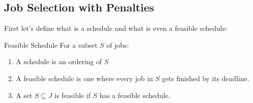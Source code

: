 \subsection{Job Selection with Penalties}

\begin{algoprob}
\end{algoprob}

First let's define what is a schedule and what is even a feasible schedule:

\begin{Definition}{Feasible Schedule}{}
	For a subset $S$ of jobs:
	\begin{enumerate}[label=\bfseries\tiny\protect\circled{\small\arabic*}]
	\item A schedule is an ordering of $S$
	\item A feasible schedule is one where every job in $S$ gets finished by its deadline.
	\item A set $S\subseteq J$ is feasible if $S$ has a feasible schedule.
	\end{enumerate}
\end{Definition}\parinn

